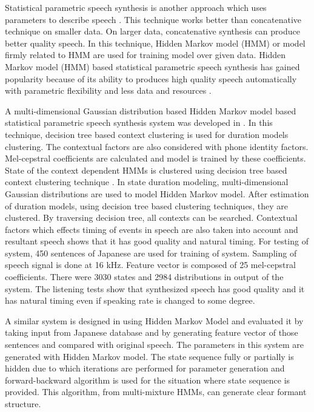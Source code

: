 Statistical parametric speech synthesis is another approach which uses parameters to describe
speech \cite{king2010beginners}. This technique works better than
concatenative technique on smaller data. On larger data, concatenative synthesis can produce better quality speech. In this technique, Hidden Markov model (HMM) or model firmly related to HMM are used for training model over given data. Hidden Markov model (HMM) based statistical parametric speech synthesis has gained popularity because of its ability to produces high quality speech automatically with parametric flexibility and less data and resources \cite{black2007statistical}.

A multi-dimensional Gaussian distribution based Hidden Markov model based statistical parametric speech synthesis system was developed in
\cite{yoshimura1998duration}.  In this technique, decision tree based context clustering is used for duration models clustering. The contextual factors are also considered with phone identity factors. Mel-cepstral coefficients are
calculated and model is trained by these coefficients. State of the context dependent HMMs is clustered using decision tree based
context clustering technique \cite{odellj.j1995}. In state duration modeling, multi-dimensional Gaussian distributions are
used to model Hidden Markov model. After estimation of duration models, using decision tree based clustering techniques,
they are clustered. By traversing decision tree, all contexts can be searched. Contextual factors which effects timing of
events in speech are also taken into account and resultant speech shows that it has good quality and natural timing. For testing
of system, 450 sentences of Japanese are used for training of system. Sampling of speech signal is done at 16 kHz. Feature
vector is composed of 25 mel-cepstral coefficients. There were 3030 states and 2984 distributions in output of the system.
The listening tests show that synthesized speech has good quality and it has natural timing even if speaking rate is changed to
some degree.

A similar system is designed in \cite{tokuda2000speech} using Hidden Markov Model and evaluated it by taking input
from Japanese database and by generating feature vector of those sentences and compared with
original speech. The parameters in this system are generated with Hidden
Markov model. The state sequence fully or partially is hidden due to which iterations are performed for parameter generation and
forward-backward algorithm is used for the situation where state sequence is provided. This algorithm, from multi-mixture HMMs,
can generate clear formant structure.

